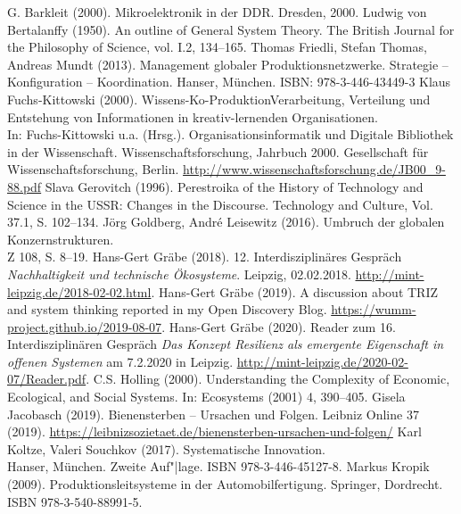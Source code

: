 \documentclass[11pt,a4paper]{article}
\begin{document}
\begin{thebibliography}{xxx}
 G. Barkleit (2000). Mikroelektronik in der
  DDR. Dresden, 2000.
 Ludwig von Bertalanffy (1950). An outline of General
  System Theory. The British Journal for the Philosophy of Science, vol. I.2,
  134–165.
 Thomas Friedli, Stefan Thomas, Andreas Mundt (2013).
  Management globaler Produktionsnetzwerke. Strategie – Konfiguration –
  Koordination. Hanser, München. ISBN: 978-3-446-43449-3
 Klaus Fuchs-Kittowski (2000).
  Wissens-Ko-ProduktionVerarbeitung, Verteilung und Entstehung von
  Informationen in kreativ-lernenden Organisationen.\\ In: Fuchs-Kittowski
  u.a. (Hrsg.). Organisationsinformatik und Digitale Bibliothek in der
  Wissenschaft. Wissenschaftsforschung, Jahrbuch 2000. Gesellschaft für
  Wissenschaftsforschung, Berlin.
  \url{http://www.wissenschaftsforschung.de/JB00_9-88.pdf}
 Slava Gerovitch (1996). Perestroika of the History of
  Technology and Science in the USSR: Changes in the Discourse. Technology and
  Culture, Vol. 37.1, S. 102--134.
 Jörg Goldberg, André Leisewitz (2016). Umbruch der
  globalen Konzernstrukturen.\\ Z 108, S. 8--19.
 Hans-Gert Gräbe (2018).  12. Interdisziplinäres Gespräch
  \emph{Nachhaltigkeit und technische Ökosysteme}. Leipzig, 02.02.2018. 
    \url{http://mint-leipzig.de/2018-02-02.html}.
 Hans-Gert Gräbe (2019).  A discussion about TRIZ
    and system thinking reported in my Open Discovery Blog.
    \url{https://wumm-project.github.io/2019-08-07}.
 Hans-Gert Gräbe (2020). Reader zum 16. Interdisziplinären
  Gespräch \emph{Das Konzept Resilienz als emergente Eigenschaft in offenen
    Systemen} am 7.2.2020 in Leipzig.
  \url{http://mint-leipzig.de/2020-02-07/Reader.pdf}.
 C.S. Holling (2000). Understanding the Complexity of
  Economic, Ecological, and Social Systems. In: Ecosystems (2001) 4, 390–405.
 Gisela Jacobasch (2019). Bienensterben -- Ursachen und
  Folgen.  Leibniz Online 37 (2019).
  \url{https://leibnizsozietaet.de/bienensterben-ursachen-und-folgen/}
 Karl Koltze, Valeri Souchkov (2017).
  Systematische Innovation.\\ Hanser, München. Zweite Auf"|lage. ISBN
  978-3-446-45127-8.
 Markus Kropik (2009). Produktionsleitsysteme in der
    Automobilfertigung. Springer, Dordrecht.\\ ISBN 978-3-540-88991-5.

\end{thebibliography}
\end{document}
